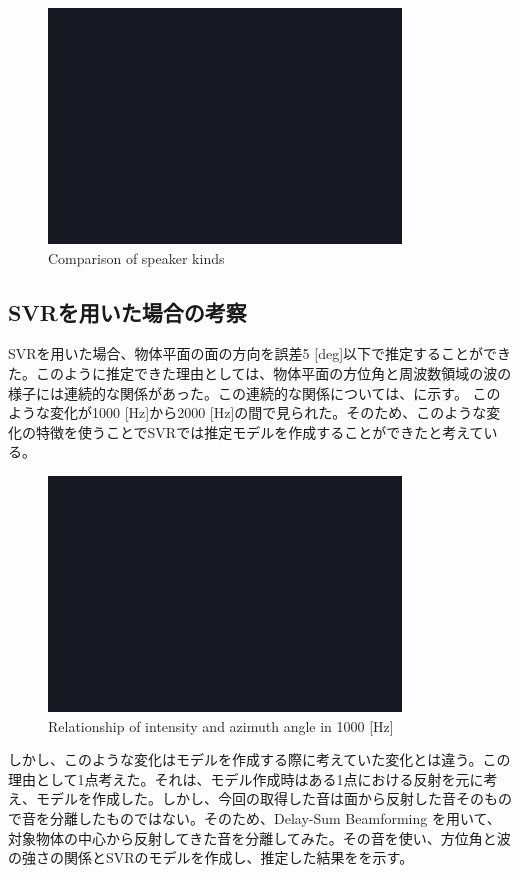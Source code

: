 \begin{figure}[tb]
  \begin{center}
  \vspace{1zh}
    \includegraphics[width=0.6\linewidth]{images/fig_sample.png}   
  \end{center}
  \caption{Comparison of speaker kinds}
  \label{fig:result_speaker_kinds}
\end{figure}

\subsection{SVRを用いた場合の考察}
SVRを用いた場合、物体平面の面の方向を誤差5 [deg]以下で推定することができた。このように推定できた理由としては、物体平面の方位角と周波数領域の波の様子には連続的な関係があった。この連続的な関係については、に示す。
このような変化が1000 [Hz]から2000 [Hz]の間で見られた。そのため、このような変化の特徴を使うことでSVRでは推定モデルを作成することができたと考えている。

\begin{figure}[tb]
  \begin{center}
  \vspace{1zh}
    \includegraphics[width=0.5\linewidth]{images/fig_sample.png}   
  \end{center}
  \caption{Relationship of intensity and azimuth angle in 1000 [Hz]}
  \label{fig:relation_intensity_azimuth}
\end{figure}

しかし、このような変化はモデルを作成する際に考えていた変化とは違う。この理由として1点考えた。それは、モデル作成時はある1点における反射を元に考え、モデルを作成した。しかし、今回の取得した音は面から反射した音そのもので音を分離したものではない。そのため、Delay-Sum Beamforming を用いて、対象物体の中心から反射してきた音を分離してみた。その音を使い、方位角と波の強さの関係とSVRのモデルを作成し、推定した結果をを示す。

